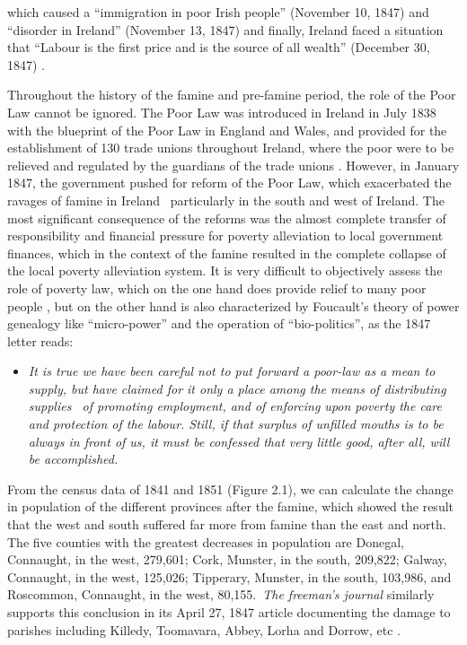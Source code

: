 which caused a ``immigration in poor Irish people'' (November 10, 1847) and ``disorder in Ireland'' (November 13, 1847) and finally, Ireland faced a situation that ``Labour is the first price and is the source of all wealth'' (December 30, 1847) \citep{times1880famineletter}.

Throughout the history of the famine and pre-famine period, the role of the Poor Law cannot be ignored. The Poor Law was introduced in Ireland in July 1838 with the blueprint of the Poor Law in England and Wales, and provided for the establishment of 130 trade unions throughout Ireland, where the poor were to be relieved and regulated by the guardians of the trade unions \citep{o1985new}. However, in January 1847, the government pushed for reform of the Poor Law, which exacerbated the ravages of famine in Ireland \textendash\ particularly in the south and west of Ireland. The most significant consequence of the reforms was the almost complete transfer of responsibility and financial pressure for poverty alleviation to local government finances, which in the context of the famine resulted in the complete collapse of the local poverty alleviation system. It is very difficult to objectively assess the role of poverty law, which on the one hand does provide relief to many poor people \citep{mchugh1986famine}, but on the other hand is also characterized by Foucault's theory of power genealogy like ``micro-power'' and the operation of ``bio-politics'', as the 1847 letter reads:

\begin{itemize}
    \item [] \textit{It is true we have been careful not to put forward a poor-law as a mean to supply, but have claimed for it only a place among the means of distributing supplies \textendash\ of promoting employment, and of enforcing upon poverty the care and protection of the labour. Still, if that surplus of unfilled mouths is to be always in front of us, it must be confessed that very little good, after all, will be accomplished.} \citep{thomas1847poorlaw}
\end{itemize}


From the census data of 1841 and 1851 (Figure 2.1), we can calculate the change in population of the different provinces after the famine, which showed the result that the west and south suffered far more from famine than the east and north. The five counties with the greatest decreases in population are Donegal, Connaught, in the west, 279,601; Cork, Munster, in the south, 209,822; Galway, Connaught, in the west, 125,026; Tipperary, Munster, in the south, 103,986, and Roscommon, Connaught, in the west, 80,155.\ \textit{The freeman's journal} similarly supports this conclusion in its April 27, 1847 article documenting the damage to parishes including Killedy, Toomavara, Abbey, Lorha and Dorrow, etc \citep{freeman1847parishes}.

